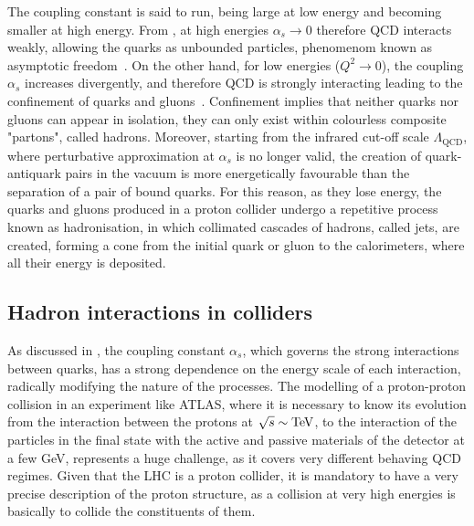 The coupling constant is said to run, being large at low energy and becoming smaller at high energy. From \Eqn{\ref{eq:theory:sm:mathematical:qcd:alphas}}, at high energies \(\alpha_s \to 0\) therefore \ac{QCD} interacts weakly, allowing the quarks as unbounded particles, phenomenom known as asymptotic freedom~\cite{Wilczek_Gross-1973,Politzer-1973}.
On the other hand, for low energies (\(Q^2 \to 0\)), the coupling \(\alpha_s\) increases divergently, and therefore \ac{QCD} is strongly interacting leading to the confinement of quarks and gluons~\cite{Glashow_Georgi-1974}. Confinement implies that neither quarks nor gluons can appear in isolation, they can only exist within colourless composite "partons", called hadrons.
Moreover, starting from the infrared cut-off scale \(\Lambda_{\text{QCD}}\), where perturbative approximation at \(\alpha_s\) is no longer valid, the creation of quark-antiquark pairs in the vacuum is more energetically favourable than the separation of a pair of bound quarks. For this reason, as they lose energy, the quarks and gluons produced in a proton collider undergo a repetitive process known as hadronisation, in which collimated cascades of hadrons, called jets, are created, forming a cone from the initial quark or gluon to the calorimeters, where all their energy is deposited.


\subsection{Hadron interactions in \pp colliders}
\label{subsec:theory:sm:hadron_interactions}

As discussed in \Sect{\ref{subsubsec:theory:sm:mathematical:qcd}}, the coupling constant \(\alpha_s\), which governs the strong interactions between quarks, has a strong dependence on the energy scale of each interaction, radically modifying the nature of the processes. The modelling of a proton-proton collision in an experiment like \ac{ATLAS}, where it is necessary to know its evolution from the interaction between the protons at \(\sqrt{s} \sim \text{TeV}\), to the interaction of the particles in the final state with the active and passive materials of the detector at a few GeV, represents a huge challenge, as it covers very different behaving \ac{QCD} regimes. Given that the \ac{LHC} is a proton collider, it is mandatory to have a very precise description of the proton structure, as a \pp collision at very high energies is basically to collide the constituents of them.

